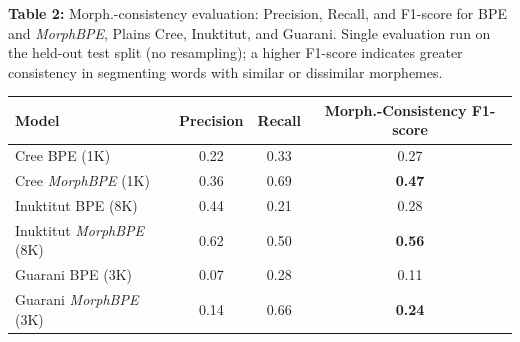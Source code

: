 \documentclass{standalone}
\begin{document}
\begin{minipage}{13.5cm}
{\bfseries Table 2:} Morph.-consistency evaluation: Precision, Recall, and F1-score for BPE and \textit{MorphBPE}, Plains Cree, Inuktitut, and Guarani. Single evaluation run on the held-out test split (no resampling); a higher F1-score indicates greater consistency in segmenting words with similar or dissimilar morphemes.

\vspace{0.5em}
\begin{tabular}{lccc}
\toprule
Model & Precision & Recall & Morph.-Consistency F1-score \\
\midrule
Cree BPE (1K)             & 0.22 & 0.33 & 0.27 \\
Cree \textit{MorphBPE} (1K)       & 0.36 & 0.69 & \textbf{0.47} \\
\addlinespace
Inuktitut BPE (8K)        & 0.44 & 0.21 & 0.28 \\
Inuktitut \textit{MorphBPE} (8K)  & 0.62 & 0.50 & \textbf{0.56} \\
\addlinespace
Guarani BPE (3K)          & 0.07 & 0.28 & 0.11 \\
Guarani \textit{MorphBPE} (3K)    & 0.14 & 0.66 & \textbf{0.24} \\
\bottomrule
\end{tabular}
\end{minipage}
\end{document}
